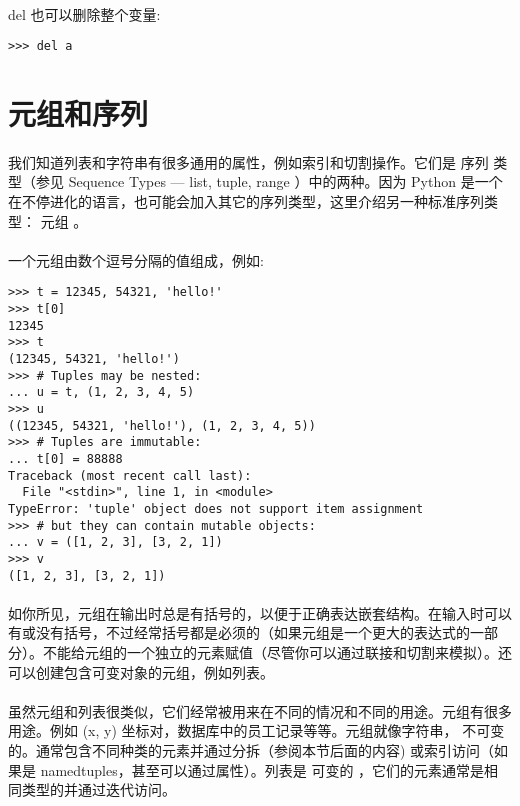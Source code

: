 \documentclass{article}
\begin{document}
\begin{CJK}{UTF8}{gbsn}
\paragraph{}
del 也可以删除整个变量:
\begin{verbatim}
>>> del a
\end{verbatim}
\section{元组和序列}
\paragraph{}
我们知道列表和字符串有很多通用的属性，例如索引和切割操作。它们是 序列 类型（参见 Sequence Types — list, tuple, range ）中的两种。因为 Python 是一个在不停进化的语言，也可能会加入其它的序列类型，这里介绍另一种标准序列类型： 元组 。
\paragraph{}
一个元组由数个逗号分隔的值组成，例如:
\begin{verbatim}
>>> t = 12345, 54321, 'hello!'
>>> t[0]
12345
>>> t
(12345, 54321, 'hello!')
>>> # Tuples may be nested:
... u = t, (1, 2, 3, 4, 5)
>>> u
((12345, 54321, 'hello!'), (1, 2, 3, 4, 5))
>>> # Tuples are immutable:
... t[0] = 88888
Traceback (most recent call last):
  File "<stdin>", line 1, in <module>
TypeError: 'tuple' object does not support item assignment
>>> # but they can contain mutable objects:
... v = ([1, 2, 3], [3, 2, 1])
>>> v
([1, 2, 3], [3, 2, 1])
\end{verbatim}
\paragraph{}
如你所见，元组在输出时总是有括号的，以便于正确表达嵌套结构。在输入时可以有或没有括号，不过经常括号都是必须的（如果元组是一个更大的表达式的一部分）。不能给元组的一个独立的元素赋值（尽管你可以通过联接和切割来模拟）。还可以创建包含可变对象的元组，例如列表。
\paragraph{}
虽然元组和列表很类似，它们经常被用来在不同的情况和不同的用途。元组有很多用途。例如 (x, y) 坐标对，数据库中的员工记录等等。元组就像字符串， 不可变的。通常包含不同种类的元素并通过分拆（参阅本节后面的内容) 或索引访问（如果是 namedtuples，甚至可以通过属性）。列表是 可变的 ，它们的元素通常是相同类型的并通过迭代访问。

\end{CJK}
\end{document}
